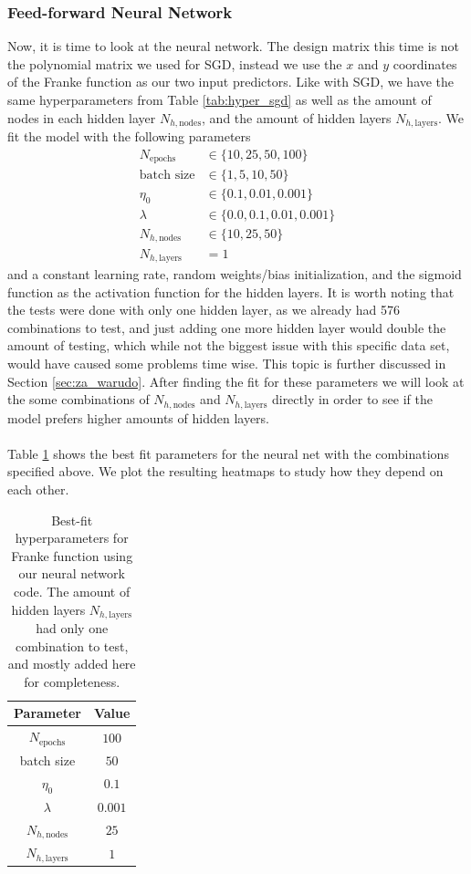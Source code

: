 \documentclass[a4paper]{article}
\newcommand{\Nepochs}{N_{\text{epochs}}}
\newcommand{\Nhn}{N_{h,\text{nodes}}}
\newcommand{\Nhl}{N_{h,\text{layers}}}
\begin{document}
\subsubsection{Feed-forward Neural Network}
Now, it is time to look at the neural network. The design matrix this time is not the polynomial matrix we used for SGD, instead we use the $x$ and $y$ coordinates of the Franke function as our two input predictors. Like with SGD, we have the same hyperparameters from Table \ref{tab:hyper_sgd} as well as the amount of nodes in each hidden layer $\Nhn$, and the amount of hidden layers $\Nhl$. We fit the model with the following parameters
\begin{align*}
	N_{\text{epochs}} &\in \{10, 25, 50, 100\}\\
	\text{batch size} &\in \{1, 5, 10, 50\}\\
	\eta_0 &\in \{0.1, 0.01, 0.001\}\\
	\lambda &\in \{0.0, 0.1, 0.01, 0.001\}\\
	\Nhn &\in \{10, 25, 50\}\\
	\Nhl &= 1
\end{align*}
and a constant learning rate, random weights/bias initialization, and the sigmoid function as the activation function for the hidden layers. It is worth noting that the tests were done with only one hidden layer, as we already had 576 combinations to test, and just adding one more hidden layer would double the amount of testing, which while not the biggest issue with this specific data set, would have caused some problems time wise. This topic is further discussed in Section \ref{sec:za_warudo}. After finding the fit for these parameters we will look at the some combinations of $\Nhn$ and $\Nhl$ directly in order to see if the model prefers higher amounts of hidden layers.
\\\\
Table \ref{tab:nn_franke_best} shows the best fit parameters for the neural net with the combinations specified above. We plot the resulting heatmaps to study how they depend on each other.
\begin{table}[H]
  \centering
  \caption{Best-fit hyperparameters for Franke function using our neural network code. The amount of hidden layers $\Nhl$ had only one combination to test, and mostly added here for completeness.}
  \label{tab:nn_franke_best}
  \begin{tabular}{c|c}
    \hline\hline
    Parameter & Value\\\hline
    $\Nepochs$ &  $100$\\
    batch size &  $50$\\
    $\eta_0$ & $0.1$ \\
    $\lambda$ & $0.001$\\
    $\Nhn$ & $25$\\
    $\Nhl$ & $1$
    \end{tabular}
\end{table}
\end{document}
